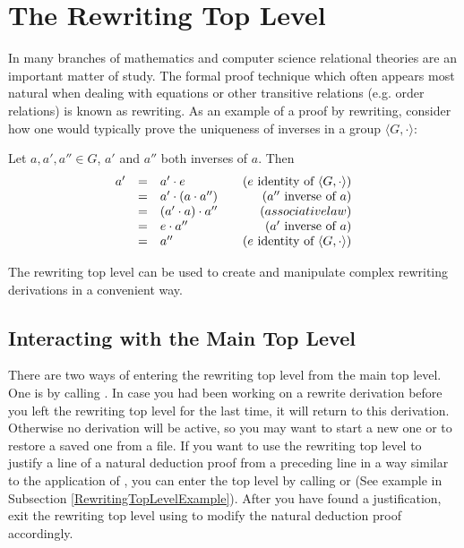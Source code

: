 \section{The Rewriting Top Level} \label{RewritingTopLevel}

In many branches of mathematics and computer science relational theories are an
important matter of study. The formal proof technique which often appears most
natural when dealing with equations or other transitive relations (e.g. order
relations) is known as rewriting. As an example of a proof by rewriting,
consider how one would typically prove the uniqueness of inverses in a group
$\langle G,\cdot\rangle$:

Let $a,a',a''\in G$, $a'$ and $a''$ both inverses of $a$. Then
\[\begin{array}{rcl@{\qquad}r}
a' & = & a'\cdot e & (e\textup{ identity of }\langle G,\cdot\rangle)\\
   & = & a'\cdot(a\cdot a'') & (a''\textup{ inverse of }a)\\
   & = & (a'\cdot a)\cdot a'' & (associative law)\\
   & = & e\cdot a'' & (a'\textup{ inverse of }a)\\
   & = & a'' & (e\textup{ identity of }\langle G,\cdot\rangle)
\end{array}\]

The rewriting top level can be used to create and manipulate
complex rewriting derivations in a convenient way.

\subsection{Interacting with the Main Top Level}

There are two ways of entering the rewriting top level from the main
top level. One is by calling . In case you had been
working on a rewrite derivation before you left the rewriting top level for
the last time, it will return to this derivation. Otherwise no derivation
will be active, so you may want to start a new one or to restore a saved one
from a file. If you want to use the rewriting top level to justify a line
of a natural deduction proof from a preceding line in a way similar to the
application of , you can enter the top level by
calling  or  (See example in
Subsection \ref{RewritingTopLevelExample}). After you
have found a justification, exit the rewriting top level using
 to modify the natural deduction proof accordingly.


